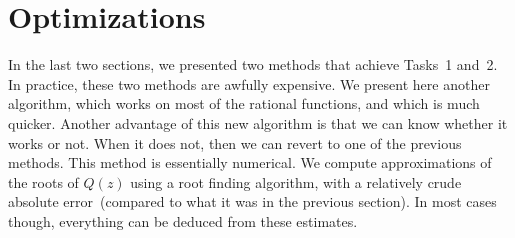 \section{Optimizations} 
In the last two sections, we presented two methods that achieve Tasks~1
and~2. In practice, these two methods are awfully expensive. We
present here another algorithm, which works on most
of the rational functions, and which is  much quicker. Another
advantage of this new algorithm is that we can know whether it works
or not. When it does
not, then we can revert  to one of the previous methods.
This method is essentially numerical. We  compute approximations of
the roots of $Q(z)$ using a root finding algorithm, with a relatively crude
absolute error~(compared to what it was in the previous section). In
most cases though, everything can be deduced from these estimates.

